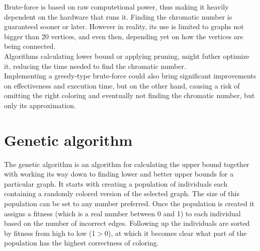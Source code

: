 \documentclass[a4paper]{report}
\begin{document}
		Brute-force is based on raw computetional power, thus making it heavily dependent on the hardware that runs it. Finding the chromatic number is guaranteed sooner or later. However in reality, its use is limited to graphs not bigger than 20 vertices, and even then, depending yet on how the vertices are being connected.\\
		
		Algorithms calculating lower bound or applying pruning, might futher optimize it, reducing the time needed to find the chromatic number. \\
		
		Implementing a greedy-type brute-force could also bring significant improvements on effectiveness and execution time, but on the other hand, causing a risk of omitting the right coloring and eventually not finding the chromatic number, but only its approximation.	
			
		\section{Genetic algorithm}
		The genetic algorithm is an algorithm for calculating the upper bound together with working its way down to finding lower and better upper bounds for a particular graph. It starts with creating a population of individuals each containing a randomly colored version of the selected graph. The size of this population can be set to any number preferred. Once the population is created it assigns a fitness (which is a real number between 0 and 1) to each individual based on the number of incorrect edges. Following up the individuals are sorted by fitness from high to low (1$>$0), at which it becomes clear what part of the population has the highest correctness of coloring.\\
		
\end{document}
